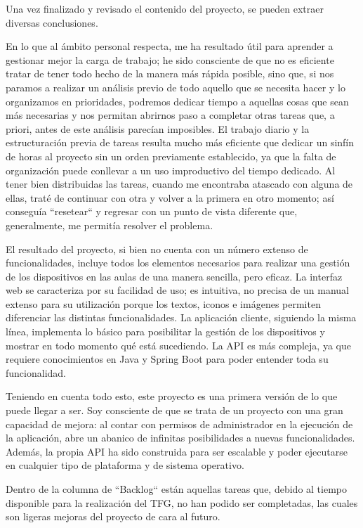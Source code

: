
Una vez finalizado y revisado el contenido del proyecto, se pueden extraer diversas conclusiones.

En lo que al ámbito personal respecta, me ha resultado útil para aprender a gestionar mejor la carga de
trabajo; he sido consciente de que no es eficiente tratar de tener todo hecho de la manera más rápida posible,
sino que, si nos paramos a realizar un análisis previo de todo aquello que se necesita hacer y lo organizamos en
prioridades, podremos dedicar tiempo a aquellas cosas que sean más necesarias y nos permitan abrirnos paso a completar
otras tareas que, a priori, antes de este análisis parecían imposibles.
El trabajo diario y la estructuración previa de tareas resulta mucho más eficiente que dedicar un sinfín de horas al
proyecto sin un orden previamente establecido, ya que la falta de organización puede conllevar a un uso
improductivo del tiempo dedicado.
Al tener bien distribuidas las tareas, cuando me encontraba atascado con alguna de ellas, traté de continuar con otra
y volver a la primera en otro momento; así conseguía ``resetear`` y regresar con un punto de vista diferente que,
generalmente, me permitía resolver el problema.

El resultado del proyecto, si bien no cuenta con un número extenso de funcionalidades, incluye todos los elementos
necesarios para realizar una gestión de los dispositivos en las aulas de una manera sencilla, pero eficaz.
La interfaz web se caracteriza por su facilidad de uso; es intuitiva, no precisa de un manual extenso para su utilización porque los
textos, iconos e imágenes permiten diferenciar las distintas funcionalidades.
La aplicación cliente, siguiendo la misma línea, implementa lo básico para posibilitar la gestión de los dispositivos
y mostrar en todo momento qué está sucediendo.
La API es más compleja, ya que requiere conocimientos en Java y Spring Boot para poder entender toda su funcionalidad.

Teniendo en cuenta todo esto, este proyecto es una primera versión de lo que puede llegar a ser.
Soy consciente de que se trata de un proyecto con una gran capacidad de mejora: al contar con permisos de administrador
en la ejecución de la aplicación, abre un abanico de infinitas posibilidades a nuevas funcionalidades.
Además, la propia API ha sido construida para ser escalable y poder ejecutarse en cualquier tipo de plataforma y de
sistema operativo.

Dentro de la columna de ``Backlog`` están aquellas tareas que, debido al tiempo disponible para la realización del TFG,
no han podido ser completadas, las cuales son ligeras mejoras del proyecto de cara al futuro.

